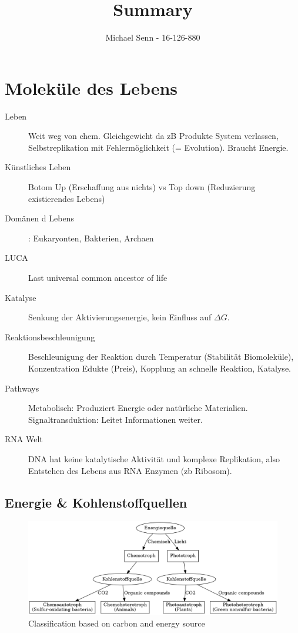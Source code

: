 \documentclass[a4paper,twocolumn,english,fontsize=7,DIV=16]{scrartcl}
\title{Summary}
\author{Michael Senn \maillink{michael.senn@students.unibe.ch} - 16-126-880}
\date{\printdate}
\begin{document}
\maketitle

\section{Moleküle des Lebens}

\begin{description}
	\item[Leben] Weit weg von chem. Gleichgewicht da zB Produkte System
		verlassen, Selbstreplikation mit Fehlermöglichkeit (=
		Evolution). Braucht Energie.
	\item[Künstliches Leben] Botom Up (Erschaffung aus nichts) vs Top down
		(Reduzierung existierendes Lebens)
	\item[Domänen d Lebens]: Eukaryonten, Bakterien, Archaen
	\item[LUCA] Last universal common ancestor of life
	\item[Katalyse] Senkung der Aktivierungsenergie, kein Einfluss auf
		$\Delta G$.
	\item[Reaktionsbeschleunigung] Beschleunigung der Reaktion durch
		Temperatur (Stabilität Biomoleküle), Konzentration Edukte
		(Preis), Kopplung an schnelle Reaktion, Katalyse.
	\item[Pathways] Metabolisch: Produziert Energie oder natürliche
		Materialien. Signaltransduktion: Leitet Informationen weiter.
	\item[RNA Welt] DNA hat keine katalytische Aktivität und komplexe
		Replikation, also Entstehen des Lebens aus RNA Enzymen (zb
		Ribosom).
\end{description}

\subsection{Energie \& Kohlenstoffquellen}

\begin{figure}
	\centering
	\includegraphics[width=\linewidth]{graphs/ec_quellen.png}
	\caption{Classification based on carbon and energy source}
\end{figure}
\end{document}

